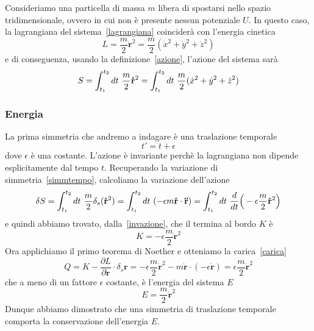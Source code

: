     \begin{example}
        Consideriamo una particella di massa $m$ libera di spostarsi nello spazio tridimensionale, ovvero in cui non è presente nessun potenziale $U$. In questo caso, la lagrangiana del sistema~\eqref{lagrangiana} coinciderà con l'energia cinetica 
    \begin{equation} \label{lag2}
        L = \frac{m}{2} \mathbf{\dot r}^2 = \frac{m}{2} (\dot x^2 + \dot y^2 + \dot z^2)
    \end{equation}
        e di conseguenza, usando la definizione~\eqref{azione}, l'azione del sistema sarà
    \begin{equation}
        S = \int_{t_1}^{t_2}dt~ \frac{m}{2} \mathbf{\dot r}^2 = \int_{t_1}^{t_2}dt~ \frac{m}{2} (\dot x^2 + \dot y^2 + \dot z^2)
    \end{equation}

    \subsubsection{Energia}
        La prima simmetria che andremo a indagare è una traslazione temporale
    \begin{equation}
        t' = t + \epsilon
    \end{equation}
        dove $\epsilon$ è una costante. L'azione è invariante perchè la lagrangiana non dipende esplicitamente dal tempo $t$. Recuperando la variazione di simmetria~\eqref{simmtempo}, calcoliamo la variazione dell'azione
    \begin{equation}
        \delta S = \int_{t_1}^{t_2}dt~ \frac{m}{2} \delta_s ( \mathbf{\dot r}^2) = \int_{t_1}^{t_2}dt~ ( - \epsilon m  \mathbf{\dot r} \cdot \mathbf{\ddot r}) = \int_{t_1}^{t_2}dt~ \frac{d}{dt} \Big( -\epsilon \frac{m}{2}  \mathbf{\dot r}^2 \Big)
    \end{equation}
        e quindi abbiamo trovato, dalla~\eqref{invazione}, che il termina al bordo $K$ è 
    \begin{equation*}
        K = - \epsilon \frac{m}{2} \mathbf{\dot r}^2
    \end{equation*}
        Ora applichiamo il primo teorema di Noether e otteniamo la carica~\eqref{carica} 
    \begin{equation}
        Q = K - \frac{\partial L}{\partial  \mathbf{\dot r}} \cdot \delta_s  \mathbf r = - \epsilon \frac{m}{2} \mathbf{\dot r}^2 - m \mathbf{\dot r} \cdot (-\epsilon \mathbf{\dot r}) = \epsilon \frac{m}{2} \mathbf{\dot r}^2
    \end{equation}
        che a meno di un fattore $\epsilon$ costante, è l'energia del sistema $E$
    \begin{equation*}
        E = \frac{m}{2} \mathbf{\dot r}^2
    \end{equation*}
        Dunque abbiamo dimostrato che una simmetria di traslazione temporale comporta la conservazione dell'energia $E$.


\end{example}
